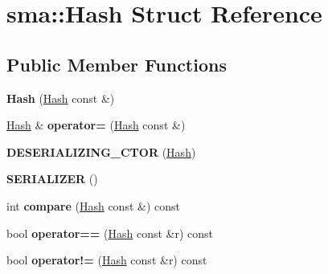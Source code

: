 \hypertarget{structsma_1_1Hash}{\section{sma\-:\-:Hash Struct Reference}
\label{structsma_1_1Hash}
}
\subsection*{Public Member Functions}
\begin{DoxyCompactItemize}
\item 
\hypertarget{structsma_1_1Hash_a66d153bdafd406376aa07b61feed174b}{{\bfseries Hash} (\hyperlink{structsma_1_1Hash}{Hash} const \&)}\label{structsma_1_1Hash_a66d153bdafd406376aa07b61feed174b}

\item 
\hypertarget{structsma_1_1Hash_ab54e4d5010fc1ce9e1aae01eff0862c6}{\hyperlink{structsma_1_1Hash}{Hash} \& {\bfseries operator=} (\hyperlink{structsma_1_1Hash}{Hash} const \&)}\label{structsma_1_1Hash_ab54e4d5010fc1ce9e1aae01eff0862c6}

\item 
\hypertarget{structsma_1_1Hash_a1debd47ad54c7c4df533c60cac58b182}{{\bfseries D\-E\-S\-E\-R\-I\-A\-L\-I\-Z\-I\-N\-G\-\_\-\-C\-T\-O\-R} (\hyperlink{structsma_1_1Hash}{Hash})}\label{structsma_1_1Hash_a1debd47ad54c7c4df533c60cac58b182}

\item 
\hypertarget{structsma_1_1Hash_a99b7f90e7b4a317f9bf6a492c03340d2}{{\bfseries S\-E\-R\-I\-A\-L\-I\-Z\-E\-R} ()}\label{structsma_1_1Hash_a99b7f90e7b4a317f9bf6a492c03340d2}

\item 
\hypertarget{structsma_1_1Hash_a608333bbc7e8f3f37c2ed49d1ef72237}{int {\bfseries compare} (\hyperlink{structsma_1_1Hash}{Hash} const \&) const }\label{structsma_1_1Hash_a608333bbc7e8f3f37c2ed49d1ef72237}

\item 
\hypertarget{structsma_1_1Hash_a99082a7a7915e01ec4a3d858e5db2cb8}{bool {\bfseries operator==} (\hyperlink{structsma_1_1Hash}{Hash} const \&r) const }\label{structsma_1_1Hash_a99082a7a7915e01ec4a3d858e5db2cb8}

\item 
\hypertarget{structsma_1_1Hash_abeace2f93af8d81eb0afb1a6d43e88b1}{bool {\bfseries operator!=} (\hyperlink{structsma_1_1Hash}{Hash} const \&r) const }\label{structsma_1_1Hash_abeace2f93af8d81eb0afb1a6d43e88b1}


\end{DoxyCompactItemize}
